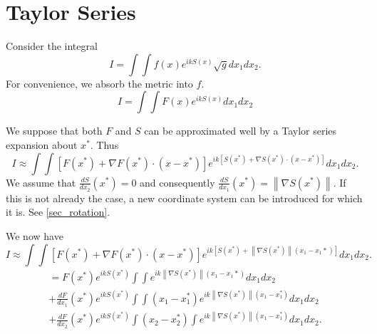 \documentclass{article}
\newcommand{\norm}[1]{\left\lVert#1\right\rVert}
\theoremstyle{plain}
\begin{document}
\section{Taylor Series}


Consider the integral
\begin{equation}
	I = \int\int f(x) e^{ikS(x)} \sqrt{g} dx_1dx_2.
\end{equation}
For convenience, we absorb the metric into $f$.
\begin{equation}
	I = \int\int F(x) e^{ikS(x)} dx_1dx_2
\end{equation}



We suppose that both $F$ and $S$ can be approximated well by a Taylor series expansion about $x^*$.
Thus
\begin{equation}
	I \approx \int\int \left[ F(x^*) + \nabla F(x^*) \cdot (x-x^*) \right] e^{ik\left[S(x^*) + \nabla S(x^*)\cdot (x-x^*) \right]} dx_1dx_2.
\end{equation}
We assume that $\frac{dS}{dx_2}(x^*) = 0$ and consequently $\frac{dS}{dx_1}(x^*) = \norm{\nabla S(x^*)}$.
If this is not already the case, a new coordinate system can be introduced for which it is. See \ref{sec_rotation}.


We now have
\begin{equation}
	I \approx \int\int \left[ F(x^*) + \nabla F(x^*) \cdot (x-x^*) \right] e^{ik\left[S(x^*) + \norm{\nabla S(x^*)}(x_1-x_1*) \right]} dx_1dx_2.
\end{equation}
\begin{multline}
	= F(x^*) e^{ikS(x^*)} \int\int e^{ik\norm{\nabla S(x^*)}(x_1-x_1*)} dx_1dx_2 \\
	+ \frac{dF}{dx_1}(x^*) e^{ikS(x^*)} \int\int (x_1-x_1^*) e^{ik\norm{\nabla S(x^*)}(x_1-x_1^*)} dx_1dx_2 \\
	+ \frac{dF}{dx_2}(x^*) e^{ikS(x^*)} \int (x_2-x_2^*) \int e^{ik\norm{\nabla S(x^*)}(x_1-x_1^*)} dx_1dx_2.
\end{multline}
\end{document}

